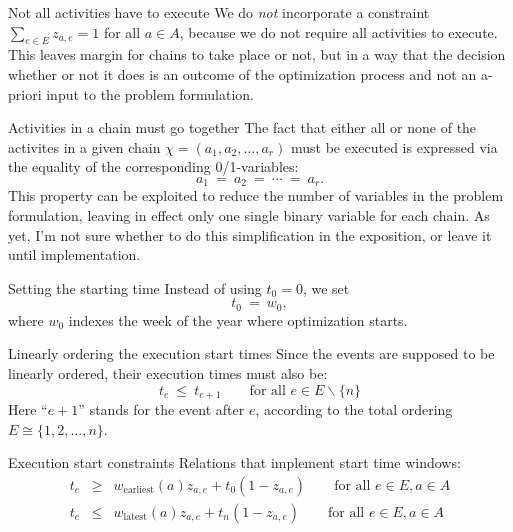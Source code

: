 \documentclass[11pt,reqno]{amsart}
\numberwithin{equation}{section}
\begin{document}
\begin{mydesc}

\item[Not all activities have to execute] We do \emph{not} incorporate a constraint
  $\sum_{e\in E} z_{a,e}=1$ for all $a\in A$, because we do not require all activities to
  execute. This leaves margin for chains to take place or not, but in a way that the
  decision whether or not it does is an outcome of the optimization process and not an
  a-priori input to the problem formulation.

\item[Activities in a chain must go together] The fact that either all or none of the
  activites in a given chain $\chi=(a_1,a_2,\dots,a_r)$ must be executed is expressed via
  the equality of the corresponding 0/1-variables:
  \begin{equation}
    a_1 \ = \ a_2 \ = \ \cdots \ = \ a_r.
  \end{equation}
  This property can be exploited to reduce the number of variables in the problem
  formulation, leaving in effect only one single binary variable for each chain. As yet,
  I'm not sure whether to do this simplification in the exposition, or leave it until
  implementation. 

\item[Setting the starting time] Instead of using $t_0=0$, we set
  \begin{equation}
     t_0
     \ = \
     w_0,
  \end{equation}
  where $w_0$ indexes the week of the year where optimization starts. 

\item[Linearly ordering the execution start times] Since the events are supposed to be linearly
  ordered,  their execution times must also be:
  \begin{equation}
     t_e 
     \ \le \
     t_{e+1}
     \qquad\text{for all }
      e\in E\smallsetminus\{n\}
  \end{equation}
  Here ``$e+1$'' stands for the event after $e$, according to the total ordering
  $E\cong\{1,2,\dots,n\}$.

\item[Execution start constraints] Relations that implement start time windows:
  \begin{eqnarray}
    t_e 
    & \ge &
    w_{\text{earliest}}(a) z_{a,e} + t_0 (1-z_{a,e})
    \qquad\text{for all } e\in E, a\in A
    \\
    t_e 
    & \le &
    w_{\text{latest}}(a) z_{a,e} + t_n(1-z_{a,e})
    \qquad\text{for all } e\in E, a\in A
  \end{eqnarray}
  


\end{mydesc}
\end{document}
